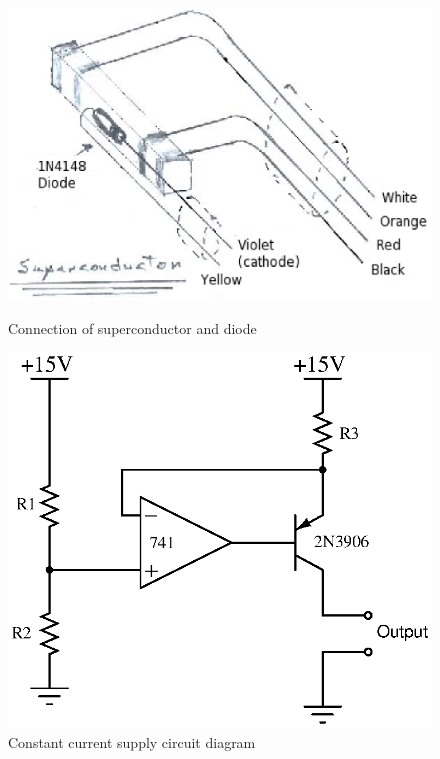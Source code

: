 \documentclass[paper=a4, fontsize=11pt]{scrartcl}
\numberwithin{equation}{section}
\numberwithin{figure}{section}
\numberwithin{table}{section}
\begin{document}
            \begin{figure}[ht]
                  \begin{minipage}[b]{0.45\linewidth}
                        \centering
                        \includegraphics[width=\textwidth]{Figures/SuperconductorDrawing.eps}
                        \caption{Connection of superconductor and diode}
                        \label{fig:scDiode}
                  \end{minipage}
                  \hspace{0.5cm}
                  \begin{minipage}[b]{0.45\linewidth}
                        \centering
                        \includegraphics[width=\textwidth]{Figures/ConstantCurrent.eps}
                        \caption{Constant current supply circuit diagram}
                        \label{fig:constantCurrent}
                  \end{minipage}
            \end{figure}
\end{document}
